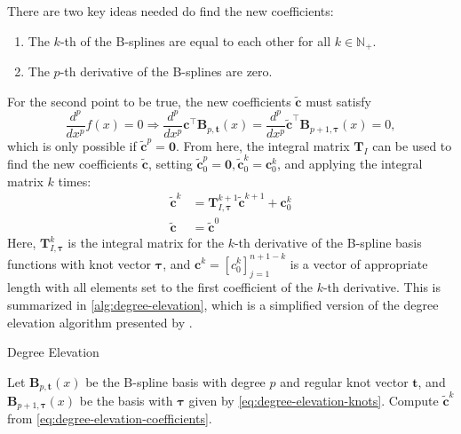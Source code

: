 There are two key ideas needed do find the new coefficients:
\begin{enumerate}
    \item The $k$-th of the B-splines are equal to each other for all $k\in\mathbb{N}_+$.
    \item The $p$-th derivative of the B-splines are zero.
\end{enumerate}
For the second point to be true, the new coefficients $\mathbf{\tilde c}$ must satisfy
\begin{equation}
    \frac{d^p}{dx^p} f(x) = 0 \Rightarrow \frac{d^p}{dx^p} \mathbf{c}^{\top} \mathbf{B}_{p, \mathbf{t}}(x) = 
    \frac{d^p}{dx^p} \mathbf{\tilde c}^{\top} \mathbf{B}_{p+1, \boldsymbol{\tau}}(x) = 0,
\end{equation}
which is only possible if $\mathbf{\tilde c}^p = \mathbf 0$. From here, the integral matrix $\mathbf T_I$ can be used to find the new coefficients $\mathbf{\tilde c}$, setting $\mathbf{\tilde c}_0^p = \mathbf 0, \mathbf{\tilde c}_0^k = \mathbf c_0^k$, and applying the integral matrix $k$ times:
\begin{equation}\label{eq:degree-elevation-coefficients}
    \begin{aligned}
        \mathbf{\tilde c}^k &= \mathbf T^{k+1}_{I,\boldsymbol\tau} \mathbf{\tilde c}^{k+1} + \mathbf{c}_0^{k} \\
        \mathbf{\tilde c} &= \mathbf{\tilde c}^0
    \end{aligned}
\end{equation}
Here, $\mathbf T^k_{I,\boldsymbol\tau}$ is the integral matrix for the $k$-th derivative of the B-spline basis functions with knot vector $\boldsymbol\tau$, and $\mathbf{c}^k = [c_0^k]_{j=1}^{n+1-k}$ is a vector of appropriate length with all elements set to the first coefficient of the $k$-th derivative. This is summarized in \cref{alg:degree-elevation}, which is a simplified version of the degree elevation algorithm presented by \cite{lee2000degree}. 

\begin{algorithm}
    \caption{Degree Elevation}\label{alg:degree-elevation}
    \begin{algorithmic}
        \State Let $\mathbf B_{p, \mathbf t}(x)$ be the B-spline basis with degree $p$ and regular knot vector $\mathbf t$, and $\mathbf B_{p+1, \boldsymbol \tau}(x)$ be the basis with $\boldsymbol \tau$ given by \cref{eq:degree-elevation-knots}.
            \State Compute $\mathbf{\tilde c}^k$ from \cref{eq:degree-elevation-coefficients}.
        \EndFor
    \end{algorithmic}
\end{algorithm}

